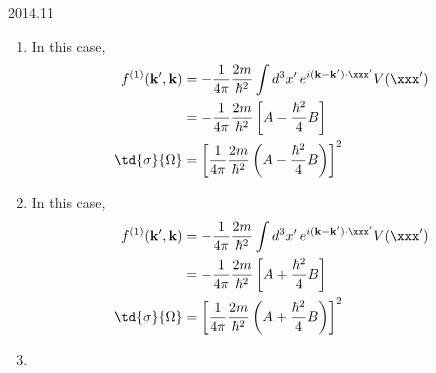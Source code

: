 \documentclass[12pt]{article}
\begin{document}
\renewcommand{\kk}{\mathbf{k}}
\begin{solution}{2014.11}
\begin{enumerate}
\item
In this case,
\begin{align*}
f^{(1)} (\kk', \kk) & = -\frac{1}{4\pi} \frac{2m}{\hbar^2} \int d^3 x' \, e^{i(\kk - \kk') \cdot \xxx'} V(\xxx') \\
& = -\frac{1}{4\pi} \frac{2m}{\hbar^2} \left[ A - \frac{\hbar^2}{4} B \right] \\
\td{\sigma}{\Omega} & = \left[ \frac{1}{4\pi} \frac{2m}{\hbar^2} \left( A - \frac{\hbar^2}{4} B \right) \right]^2
\end{align*}

\item
In this case,
\begin{align*}
f^{(1)} (\kk', \kk) & = -\frac{1}{4\pi} \frac{2m}{\hbar^2} \int d^3 x' \, e^{i(\kk - \kk') \cdot \xxx'} V(\xxx') \\
& = -\frac{1}{4\pi} \frac{2m}{\hbar^2} \left[ A + \frac{\hbar^2}{4} B \right] \\
\td{\sigma}{\Omega} & = \left[ \frac{1}{4\pi} \frac{2m}{\hbar^2} \left( A + \frac{\hbar^2}{4} B \right) \right]^2
\end{align*}

\item


\end{enumerate}

\end{solution}
\end{document}
